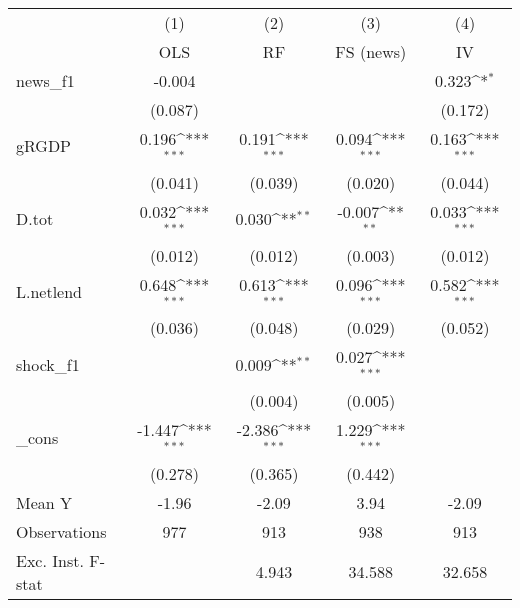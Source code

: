 {
\def\sym#1{\ifmmode^{#1}\else\(^{#1}\)\fi}
\begin{tabular}{l*{4}{c}}
\toprule
            &\multicolumn{1}{c}{(1)}&\multicolumn{1}{c}{(2)}&\multicolumn{1}{c}{(3)}&\multicolumn{1}{c}{(4)}\\
            &\multicolumn{1}{c}{OLS}&\multicolumn{1}{c}{RF}&\multicolumn{1}{c}{FS (news)}&\multicolumn{1}{c}{IV}\\
\midrule
news\_f1     &      -0.004         &                     &                     &       0.323\sym{*}  \\
            &     (0.087)         &                     &                     &     (0.172)         \\
\addlinespace
gRGDP       &       0.196\sym{***}&       0.191\sym{***}&       0.094\sym{***}&       0.163\sym{***}\\
            &     (0.041)         &     (0.039)         &     (0.020)         &     (0.044)         \\
\addlinespace
D.tot       &       0.032\sym{***}&       0.030\sym{**} &      -0.007\sym{**} &       0.033\sym{***}\\
            &     (0.012)         &     (0.012)         &     (0.003)         &     (0.012)         \\
\addlinespace
L.netlend   &       0.648\sym{***}&       0.613\sym{***}&       0.096\sym{***}&       0.582\sym{***}\\
            &     (0.036)         &     (0.048)         &     (0.029)         &     (0.052)         \\
\addlinespace
shock\_f1    &                     &       0.009\sym{**} &       0.027\sym{***}&                     \\
            &                     &     (0.004)         &     (0.005)         &                     \\
\addlinespace
\_cons      &      -1.447\sym{***}&      -2.386\sym{***}&       1.229\sym{***}&                     \\
            &     (0.278)         &     (0.365)         &     (0.442)         &                     \\
\midrule
Mean Y      &       -1.96         &       -2.09         &        3.94         &       -2.09         \\
Observations&         977         &         913         &         938         &         913         \\
Exc. Inst. F-stat&                     &       4.943         &      34.588         &      32.658         \\
\bottomrule
\end{tabular}
}
